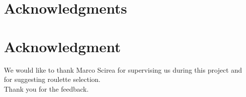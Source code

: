 \documentclass[conference,compsoc]{IEEEtran}
\begin{document}
\newpage

\nocite{*} %
 


\ifCLASSOPTIONcompsoc
  \section*{Acknowledgments}
\else
  \section*{Acknowledgment}
\fi
We would like to thank Marco Scirea for supervising us during this project and for suggesting roulette selection.\\
Thank you for the feedback.\\
\end{document}
